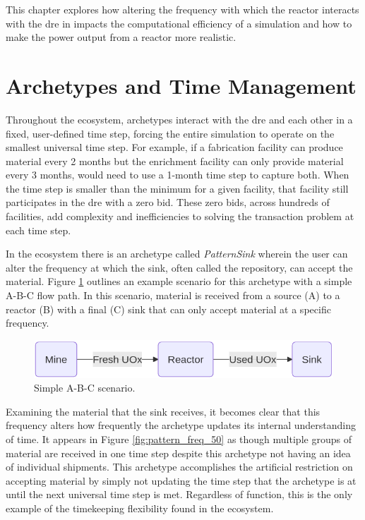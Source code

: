 This chapter explores how altering the frequency with which the \cycamore reactor interacts with the \gls{dre} in \cyclus impacts the computational efficiency of a simulation and how to make the power output from a reactor more realistic.

\section{Archetypes and Time Management}
\label{sec:archetypes_and_time_management}

Throughout the \cyclus ecosystem, archetypes interact with the \gls{dre} and
each other in a fixed, user-defined time step, forcing the entire simulation
to operate on the smallest universal time step. For example, if a fabrication
facility can produce material every 2 months but the enrichment facility can
only provide material every 3 months, \cyclus would need to use a 1-month time step to capture both. When the time step is smaller than the minimum for a given
facility, that facility still participates in the \gls{dre} with a zero bid.
These zero bids, across hundreds of facilities, add complexity and
inefficiencies to solving the transaction problem at each time step.

In the \cyclus ecosystem there is an archetype called \textit{PatternSink} wherein the user can alter the frequency at which the sink, often called the repository, can accept the material. Figure \ref{fig:a-b-c} outlines an example scenario for this archetype with a simple A-B-C flow path. In this scenario, material is received from a source (A) to a reactor (B) with a final (C) sink that can only accept material at a specific frequency.

\begin{figure}[H]
    \centering
    \includegraphics[scale=0.4]{images/cyclus/a-b-c.png}
    \caption{Simple A-B-C scenario.}
    \label{fig:a-b-c}
\end{figure}

Examining the material that the sink receives, it becomes clear that this
frequency alters how frequently the archetype updates its internal
understanding of time. It appears in Figure \ref{fig:pattern_freq_50} as though
multiple groups of material are received in one time step despite this
archetype not having an idea of individual shipments. This archetype
accomplishes the artificial restriction on accepting material by simply not
updating the time step that the archetype is at until the next universal time
step is met. Regardless of function, this is the only example of the
timekeeping flexibility found in the ecosystem.

